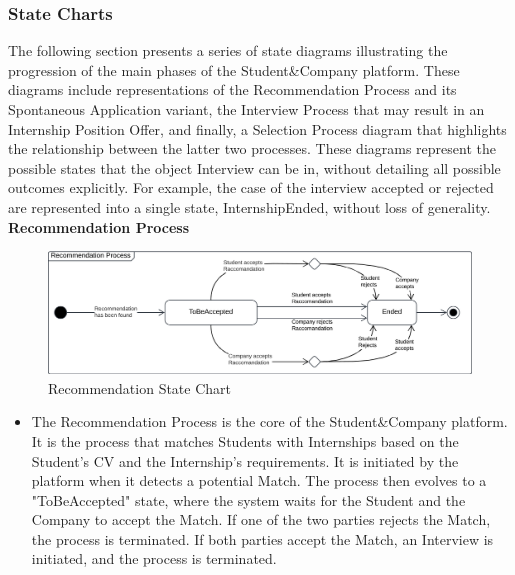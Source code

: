 \subsubsection{State Charts}
The following section presents a series of state diagrams illustrating the progression of the main phases of the Student\&Company platform. These diagrams include representations of the Recommendation Process and its Spontaneous Application variant, the Interview Process that may result in an Internship Position Offer, and finally, a Selection Process diagram that highlights the relationship between the latter two processes.
These diagrams represent the possible states that the object Interview can be in, without detailing all possible outcomes explicitly. For example, the case of the interview accepted or rejected are represented into a single state, InternshipEnded, without loss of generality.
\newline\newline
\noindent\textbf{\color{titleColor}Recommendation Process}\\
\begin{figure}[ht]
    \centering
    \includegraphics[width=1 \textwidth]{Latex/Images/RASD/StateCharts/RecommendationStateChart.png}
    \caption{Recommendation State Chart}
    \label{fig:RecommendationProcess}
\end{figure}
\begin{itemize}
    \item The Recommendation Process is the core of the Student\&Company platform. It is the process that matches Students with Internships based on the Student's CV and the Internship's requirements. It is initiated by the platform when it detects a potential Match. The process then evolves to a "ToBeAccepted" state, where the system waits for the Student and the Company to accept the Match. If one of the two parties rejects the Match, the process is terminated. If both parties accept the Match, an Interview is initiated, and the process is terminated.
\end{itemize}

